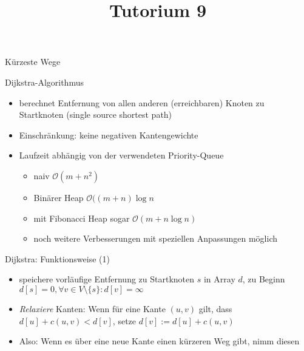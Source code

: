 
\title[Algorithmen I SS 14]{Tutorium 9}

\usepackage{alltt}




\begin{frame}
  \maketitle
\end{frame}

\begin{frame}
	\begin{center}
		\Huge
		Kürzeste Wege
	\end{center}
\end{frame}

\begin{frame}{Dijkstra-Algorithmus}
	\begin{itemize}
		\item berechnet Entfernung von allen anderen (erreichbaren) Knoten zu Startknoten (single source shortest path)
		\item Einschränkung: keine negativen Kantengewichte
		\item Laufzeit abhängig von der verwendeten Priority-Queue
			\begin{itemize}
				\item naiv $\mathcal{O}(m + n^2)$
				\item Binärer Heap $\mathcal{O}((m + n) \log{n}$
				\item mit Fibonacci Heap sogar $\mathcal{O}(m + n \log{n})$
				\item noch weitere Verbesserungen mit speziellen Anpassungen möglich
			\end{itemize}
	\end{itemize}
\end{frame}

\begin{frame}{Dijkstra: Funktionsweise (1)}
	\begin{itemize}
		\item speichere vorläufige Entfernung zu Startknoten $s$ in Array $d$, zu Beginn $d[s] = 0, \forall v \in V\setminus{\{s\}}: d[v] = \infty$
		\item \emph{Relaxiere} Kanten: Wenn für eine Kante $(u, v)$ gilt, dass $d[u] + c(u, v) < d[v]$, setze $d[v] := d[u] + c(u, v)$
		\item Also: Wenn es über eine neue Kante einen kürzeren Weg gibt, nimm diesen
	\end{itemize}
\end{frame}

